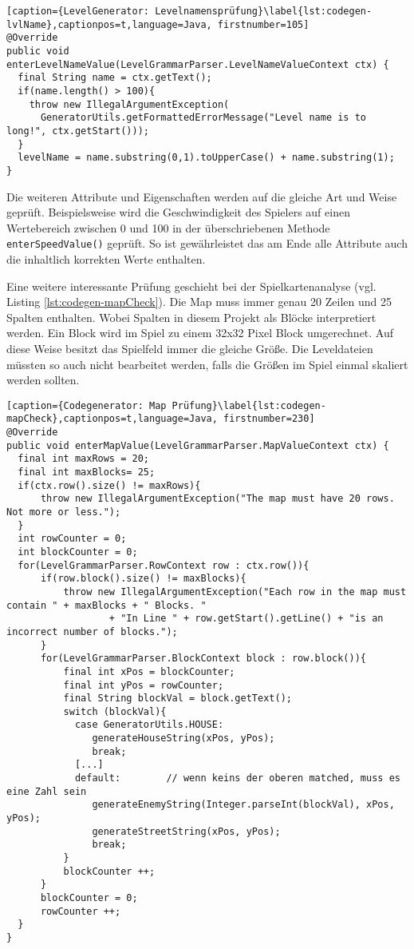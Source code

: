 \begin{lstlisting}[caption={LevelGenerator: Levelnamensprüfung}\label{lst:codegen-lvlName},captionpos=t,language=Java, firstnumber=105]
@Override
public void enterLevelNameValue(LevelGrammarParser.LevelNameValueContext ctx) {
  final String name = ctx.getText();
  if(name.length() > 100){
    throw new IllegalArgumentException(
      GeneratorUtils.getFormattedErrorMessage("Level name is to long!", ctx.getStart()));
  }
  levelName = name.substring(0,1).toUpperCase() + name.substring(1);
}
\end{lstlisting}

Die weiteren Attribute und Eigenschaften werden auf die gleiche Art und Weise geprüft. Beispielsweise wird die Geschwindigkeit des Spielers auf einen Wertebereich zwischen 0 und 100 in der überschriebenen Methode \texttt{enterSpeedValue()} geprüft. So ist gewährleistet das am Ende alle Attribute auch die inhaltlich korrekten Werte enthalten. 

Eine weitere interessante Prüfung geschieht bei der Spielkartenanalyse (vgl. Listing \ref{lst:codegen-mapCheck}). Die Map muss immer genau 20 Zeilen und 25 Spalten enthalten. Wobei Spalten in diesem Projekt als Blöcke interpretiert werden. Ein Block wird im Spiel zu einem 32x32 Pixel Block umgerechnet. Auf diese Weise besitzt das Spielfeld immer die gleiche Größe. Die Leveldateien müssten so auch nicht bearbeitet werden, falls die Größen im Spiel einmal skaliert werden sollten.

\begin{lstlisting}[caption={Codegenerator: Map Prüfung}\label{lst:codegen-mapCheck},captionpos=t,language=Java, firstnumber=230]
@Override
public void enterMapValue(LevelGrammarParser.MapValueContext ctx) {
  final int maxRows = 20;
  final int maxBlocks= 25;
  if(ctx.row().size() != maxRows){
      throw new IllegalArgumentException("The map must have 20 rows. Not more or less.");
  }
  int rowCounter = 0;
  int blockCounter = 0;
  for(LevelGrammarParser.RowContext row : ctx.row()){
      if(row.block().size() != maxBlocks){
          throw new IllegalArgumentException("Each row in the map must contain " + maxBlocks + " Blocks. "
                  + "In Line " + row.getStart().getLine() + "is an incorrect number of blocks.");
      }
      for(LevelGrammarParser.BlockContext block : row.block()){
          final int xPos = blockCounter;
          final int yPos = rowCounter;
          final String blockVal = block.getText();
          switch (blockVal){
            case GeneratorUtils.HOUSE:
               generateHouseString(xPos, yPos);
               break;
            [...]
            default:        // wenn keins der oberen matched, muss es eine Zahl sein
               generateEnemyString(Integer.parseInt(blockVal), xPos, yPos);
               generateStreetString(xPos, yPos);
               break;
          }
          blockCounter ++;
      }
      blockCounter = 0;
      rowCounter ++;
  }
}
\end{lstlisting}

